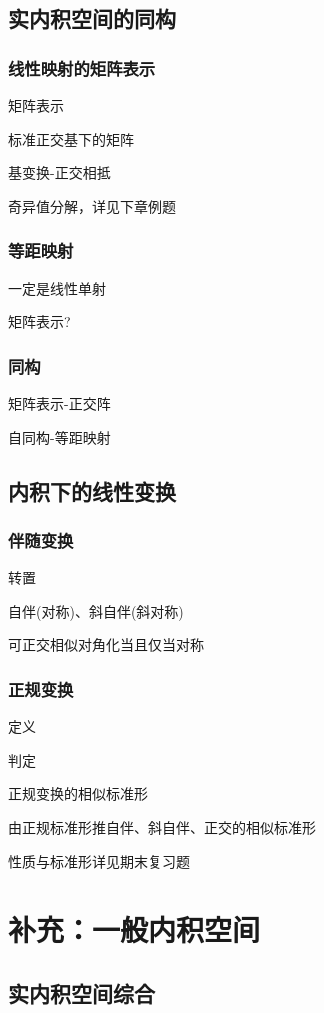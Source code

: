 \documentclass[a4paper,UTF8,fontset=windows,AutoFakeBold]{ctexart}
\begin{document}
\subsection{实内积空间的同构}
\subsubsection{线性映射的矩阵表示}
矩阵表示

标准正交基下的矩阵

基变换-正交相抵

奇异值分解，详见下章例题

\subsubsection{等距映射}
一定是线性单射

矩阵表示?

\subsubsection{同构}
矩阵表示-正交阵

自同构-等距映射

\subsection{内积下的线性变换}
\subsubsection{伴随变换}
转置

自伴(对称)、斜自伴(斜对称)

可正交相似对角化当且仅当对称

\subsubsection{正规变换}
定义

判定

正规变换的相似标准形

由正规标准形推自伴、斜自伴、正交的相似标准形

性质与标准形详见期末复习题

\section{补充：一般内积空间}
\subsection{实内积空间综合}
\end{document}
